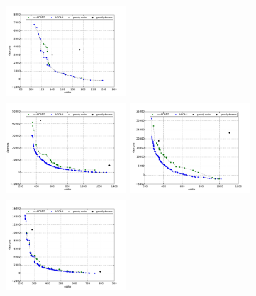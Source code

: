 \begin{columns}[t]
\centering
\includegraphics[width=4.5cm,height=3.5cm]{./evaluacion_experimental/fp_comparacion/Ch_6_1.pdf}\\
\includegraphics[width=4.5cm,height=3.5cm]{./evaluacion_experimental/fp_comparacion/Me_5_3.pdf}
\centering
\includegraphics[width=4.5cm,height=3.5cm]{./evaluacion_experimental/fp_comparacion/Gr_5_2.pdf}\\
\includegraphics[width=4.5cm,height=3.5cm]{./evaluacion_experimental/fp_comparacion/Mo_4_3.pdf}
\end{columns}